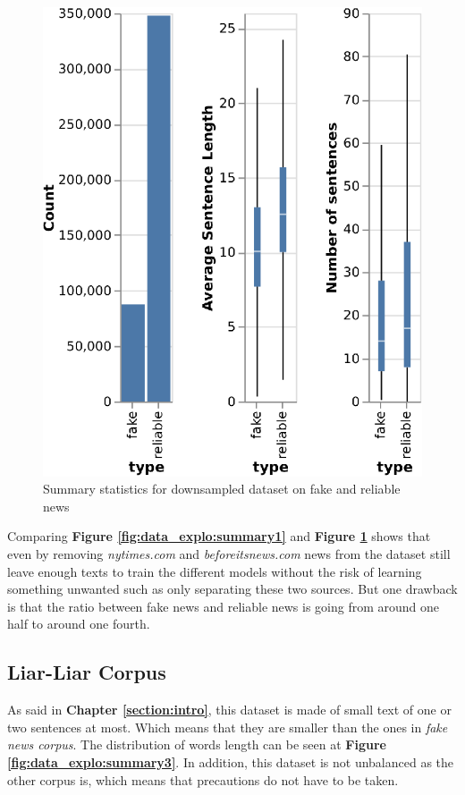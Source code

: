 \begin{figure}[h]
 \centering
 \includegraphics{images/data_exploration/downsampled.eps}
 \caption{Summary statistics for downsampled dataset on fake and reliable news}
 \label{fig:data_explo:summary2}
\end{figure}
Comparing \textbf{Figure \ref{fig:data_explo:summary1}} and \textbf{Figure \ref{fig:data_explo:summary2}} shows that even by removing \textit{nytimes.com} and \textit{beforeitsnews.com} news from the dataset still leave enough texts to train the different models without the risk of learning something unwanted such as only separating these two sources. But one drawback is that the ratio between fake news and reliable news is going from around one half to around one fourth. 

\subsection{Liar-Liar Corpus}
As said in \textbf{Chapter \ref{section:intro}}, this dataset is made of small text of one or two sentences at most. Which means that they are smaller than the ones in \textit{fake news corpus}. The distribution of words length can be seen at \textbf{Figure \ref{fig:data_explo:summary3}}. In addition, this dataset is not unbalanced as the other corpus is, which means that precautions do not have to be taken. \\

